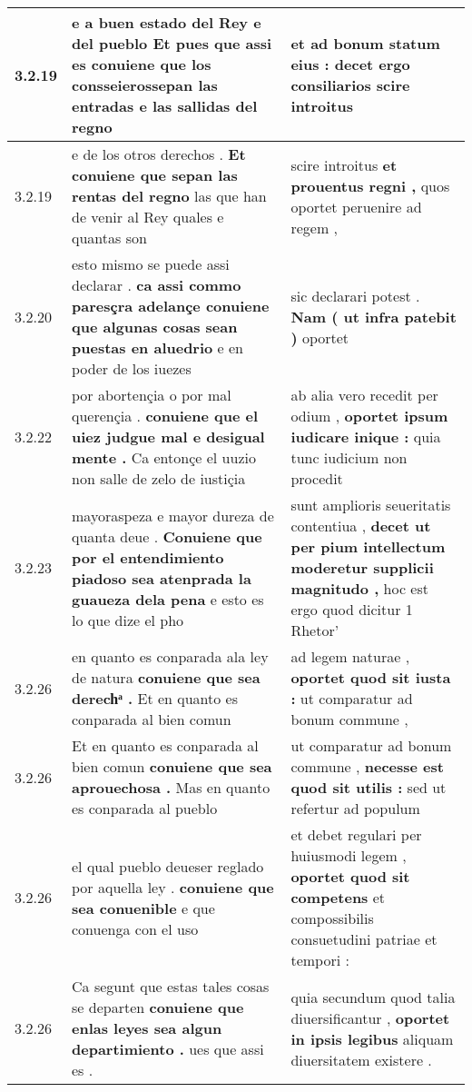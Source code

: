 \begin{tabular}{|p{1cm}|p{6.5cm}|p{6.5cm}|}
3.2.19 & e a buen estado del Rey e del pueblo \textbf{ Et pues que assi es conuiene que los } consseierossepan las entradas e las sallidas del regno & et ad bonum statum eius : \textbf{ decet ergo consiliarios } scire introitus \\\hline
3.2.19 & e de los otros derechos . \textbf{ Et conuiene que sepan las rentas del regno } las que han de venir al Rey quales e quantas son & scire introitus \textbf{ et prouentus regni , } quos oportet peruenire ad regem , \\\hline
3.2.20 & esto mismo se puede assi declarar . \textbf{ ca assi commo paresçra adelançe conuiene que algunas cosas sean puestas en aluedrio } e en poder de los iuezes & sic declarari potest . \textbf{ Nam ( ut infra patebit ) } oportet \\\hline
3.2.22 & por abortençia o por mal querençia . \textbf{ conuiene que el uiez judgue mal e desigual mente . } Ca entonçe el uuzio non salle de zelo de iustiçia & ab alia vero recedit per odium , \textbf{ oportet ipsum iudicare inique : } quia tunc iudicium non procedit \\\hline
3.2.23 & mayoraspeza e mayor dureza de quanta deue . \textbf{ Conuiene que por el entendimiento piadoso sea atenprada la guaueza dela pena } e esto es lo que dize el pho & sunt amplioris seueritatis contentiua , \textbf{ decet ut per pium intellectum moderetur supplicii magnitudo , } hoc est ergo quod dicitur 1 Rhetor’ \\\hline
3.2.26 & en quanto es conparada ala ley de natura \textbf{ conuiene que sea derechͣ . } Et en quanto es conparada al bien comun & ad legem naturae , \textbf{ oportet quod sit iusta : } ut comparatur ad bonum commune , \\\hline
3.2.26 & Et en quanto es conparada al bien comun \textbf{ conuiene que sea aprouechosa . } Mas en quanto es conparada al pueblo & ut comparatur ad bonum commune , \textbf{ necesse est quod sit utilis : } sed ut refertur ad populum \\\hline
3.2.26 & el qual pueblo deueser reglado por aquella ley . \textbf{ conuiene que sea conuenible } e que conuenga con el uso & et debet regulari per huiusmodi legem , \textbf{ oportet quod sit competens } et compossibilis consuetudini patriae et tempori : \\\hline
3.2.26 & Ca segunt que estas tales cosas se departen \textbf{ conuiene que enlas leyes sea algun departimiento . } ues que assi es . & quia secundum quod talia diuersificantur , \textbf{ oportet in ipsis legibus } aliquam diuersitatem existere . \\\hline

\end{tabular}

